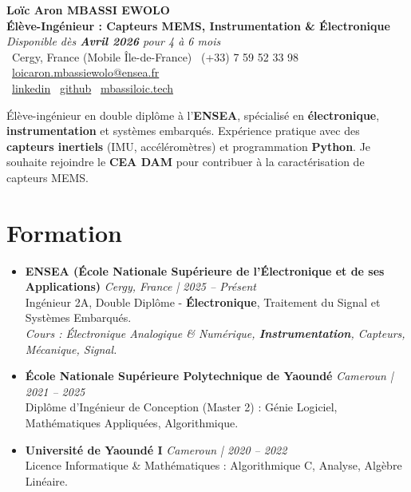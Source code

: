 \documentclass[a4paper,11pt]{article}
\begin{document}
\begin{center}
    {\Large \textbf{Loïc Aron MBASSI EWOLO}} \\ \vspace{4pt}
    \textbf{\large Élève-Ingénieur : Capteurs MEMS, Instrumentation \& Électronique} \\
    \textit{\small Disponible dès \textbf{Avril 2026} pour 4 à 6 mois} \\ \vspace{4pt}
    \small
    \faMapMarker\ Cergy, France (Mobile Île-de-France) \quad
    \faPhone\ (+33) 7 59 52 33 98 \quad
    \faEnvelope\ \href{mailto:loicaron.mbassiewolo@ensea.fr}{loicaron.mbassiewolo@ensea.fr} \\ \vspace{2pt}
    \faLinkedin\ \href{https://www.linkedin.com/in/loic-aron-mbassi-ewolo-3942a9246/}{linkedin} \quad
    \faGithub\ \href{https://github.com/Nameless0l}{github} \quad
    \faGlobe\ \href{https://mbassiloic.tech}{mbassiloic.tech}
\end{center}

\vspace{-6pt}

\noindent\small{Élève-ingénieur en double diplôme à l'\textbf{ENSEA}, spécialisé en \textbf{électronique}, \textbf{instrumentation} et systèmes embarqués. Expérience pratique avec des \textbf{capteurs inertiels} (IMU, accéléromètres) et programmation \textbf{Python}. Je souhaite rejoindre le \textbf{CEA DAM} pour contribuer à la caractérisation de capteurs MEMS.}

\section{Formation}
\begin{itemize}[leftmargin=*, label={.}, nosep]
    \item \textbf{ENSEA (École Nationale Supérieure de l'Électronique et de ses Applications)} \hfill \textit{Cergy, France | 2025 -- Présent} \\
    \small{Ingénieur 2A, Double Diplôme - \textbf{Électronique}, Traitement du Signal et Systèmes Embarqués.} \\
    \textit{\small{Cours : Électronique Analogique \& Numérique, \textbf{Instrumentation}, Capteurs, Mécanique, Signal.}}
    \vspace{2pt}
    \item \textbf{École Nationale Supérieure Polytechnique de Yaoundé} \hfill \textit{Cameroun | 2021 -- 2025} \\
    \small{Diplôme d'Ingénieur de Conception (Master 2) : Génie Logiciel, Mathématiques Appliquées, Algorithmique.}
    \item \textbf{Université de Yaoundé I} \hfill \textit{Cameroun | 2020 -- 2022} \\
    \small{Licence Informatique \& Mathématiques : Algorithmique C, Analyse, Algèbre Linéaire.}
\end{itemize}
\end{document}
